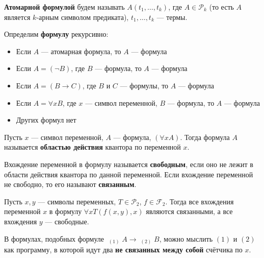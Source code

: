 \documentclass[11pt]{article}
\begin{document}
\begin{definition}
    \textbf{Атомарной формулой} будем называть $A(t_1, \ldots, t_k)$, где $A \in \mathcal{P}_k$ (то есть $A$ является $k$-арным символом предиката), $t_1, \ldots, t_k$ --- термы. 
\end{definition}

\begin{definition}
    Определим \textbf{формулу} рекурсивно:
    \begin{itemize}
        \item Если $A$ --- атомарная формула, то $A$ --- формула
        \item Если $A = (\lnot B)$, где $B$ --- формула, то $A$ --- формула
        \item Если $A = (B \to C)$, где $B$ и $C$ --- формулы, то $A$ --- формула
        \item Если $A = \forall x B$, где $x$ --- символ переменной, $B$ --- формула, то $A$ --- формула
        \item Других формул нет
    \end{itemize}
\end{definition}

\begin{definition}
    Пусть $x$ --- символ переменной, $A$ --- формула, $(\forall x A)$. Тогда формула $A$ называется \textbf{областью действия} квантора по переменной $x$.
\end{definition}

\begin{definition}
    Вхождение переменной в формулу называется \textbf{свободным}, если оно не лежит в области действия квантора по данной переменной. Если 
    вхождение переменной не свободно, то его называют \textbf{связанным}.
\end{definition}

\begin{example}
    Пусть $x, y$ --- символы переменных, $T \in \mathcal{P}_2$, $f \in \mathcal{F}_2$. Тогда все вхождения переменной $x$ в формулу $\forall x T(f(x, y), x)$ являются связанными, а все вхождения $y$ --- свободные.
\end{example}

\begin{remark}
    В формулах, подобных формуле $\displaystyle \mathop{\underline{\forall x}}_{(1)} A \to \mathop{\underline{\forall x}}_{(2)} B$, можно мыслить $(1)$ и $(2)$ как программу, в которой идут два \textbf{не связанных между собой} счётчика по $x$.
\end{remark}
\end{document}
